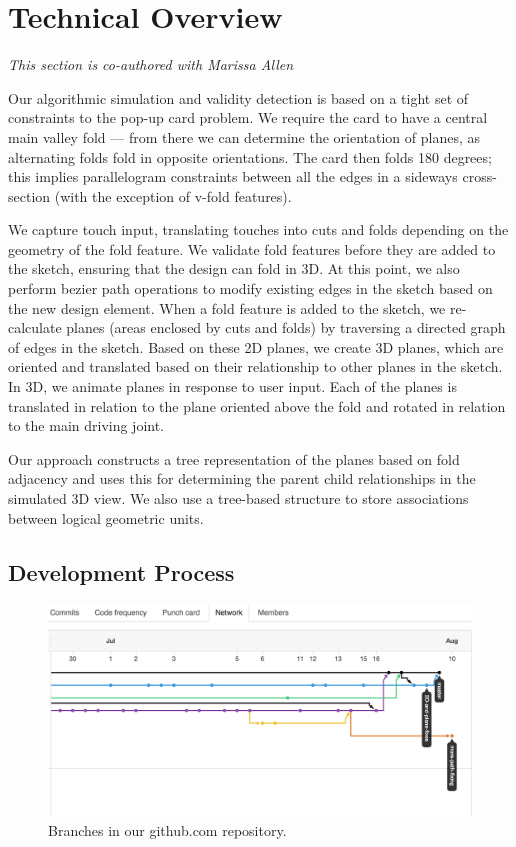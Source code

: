 \section{Technical Overview}\label{technical-overview}

\emph{This section is co-authored with Marissa Allen}

Our algorithmic simulation and validity detection is based on a tight
set of constraints to the pop-up card problem. We require the card to
have a central main valley fold --- from there we can determine the
orientation of planes, as alternating folds fold in opposite
orientations. The card then folds 180 degrees; this implies
parallelogram constraints between all the edges in a sideways
cross-section (with the exception of v-fold features).

We capture touch input, translating touches into cuts and folds
depending on the geometry of the fold feature. We validate fold features
before they are added to the sketch, ensuring that the design can fold
in 3D. At this point, we also perform bezier path operations to modify
existing edges in the sketch based on the new design element. When a
fold feature is added to the sketch, we re-calculate planes (areas
enclosed by cuts and folds) by traversing a directed graph of edges in
the sketch. Based on these 2D planes, we create 3D planes, which are
oriented and translated based on their relationship to other planes in
the sketch. In 3D, we animate planes in response to user input. Each of
the planes is translated in relation to the plane oriented above the
fold and rotated in relation to the main driving joint.

Our approach constructs a tree representation of the planes based on
fold adjacency and uses this for determining the parent child
relationships in the simulated 3D view. We also use a tree-based
structure to store associations between logical geometric units.

\subsection{Development Process}\label{development-process}

\begin{figure}[htbp]
\centering
\includegraphics{figures/shared/02_Overview/gitflow.png}
\caption{Branches in our github.com repository.}
\end{figure}

